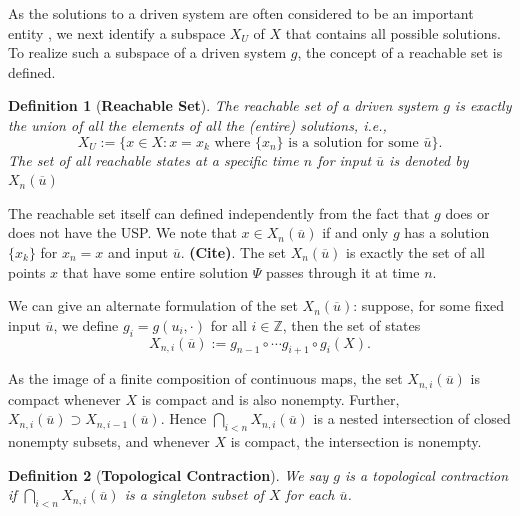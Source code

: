 \documentclass[a4paper,12pt,twoside]{report}
\newtheorem{Definition}{Definition}[]
\begin{document}
As the solutions to a driven system are often considered to be an important entity \cite{M: edited the sentence here}, we next identify a subspace $X_U$ of $X$ that contains all possible solutions. To realize such a subspace of a driven system $g$, the concept of a reachable set is defined.

\begin{Definition}
  [\bf Reachable Set]\label{Dfn_ReachableSet}\rm
The reachable set of a driven system $g$ is exactly the union of all the elements of all the (entire) solutions, i.e., 
\[X_U :=\Big \{x \in X:  x = x_k \mbox{ where  $\{x_n\}$  is a solution for some  $\bar{u}$} \Big \}.\]
The set of all reachable states at a specific time $n$ for input $\overline{u}$ is denoted by $X_n(\overline{u})$
\end{Definition}

The reachable set itself can defined independently from the fact that $g$ does or does not have the USP. We note that $x\in{X_n(\overline{u})}$ if and only $g$ has a solution $\{x_k\}$ for $x_n=x$ and input $\overline{u}$. \textbf{(Cite)}.
The set $X_n(\overline{u})$ is exactly the set of all points $x$ that have some entire solution $\Psi$ passes through it at time $n$.  

We can give an alternate formulation of the set $X_n(\overline{u})$:
suppose, for some fixed input 
$\overline{u}$, we define $g_i = g(u_i,\cdot)$ for all $i\in \mathbb{Z}$, then the set of states
\begin{equation} \label{eqn_association}
X_{n,i}(\overline{u}) := g_{n-1} \circ \cdots g_{i+1} \circ g_i(X).
\end{equation}

As the image of a finite composition of continuous maps, the set $X_{n,i}(\overline{u})$ is compact whenever $X$ is compact and is also nonempty.
Further, $X_{n,i}(\overline{u}) \supset X_{n,i-1}(\overline{u})$. Hence $\bigcap_{i<n}
X_{n,i}(\overline{u})$ is a nested intersection of closed nonempty subsets, and
whenever $X$ is compact, the intersection is nonempty.  

\begin{Definition}
  [\bf Topological Contraction]\label{Dfn_TopContr}\rm
  We say $g$ is a topological contraction if $\bigcap_{i<n}X_{n,i}(\overline{u})$ is a singleton subset of $X$ for each $\overline{u}$. 
\end{Definition}
\end{document}
